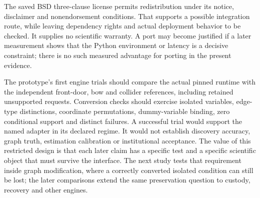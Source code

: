 The saved BSD three-clause license permits redistribution under its
notice, disclaimer and nonendorsement conditions. That supports a
possible integration route, while leaving dependency rights and actual
deployment behavior to be checked. It supplies no scientific warranty. A
port may become justified if a later measurement shows that the Python
environment or latency is a decisive constraint; there is no such
measured advantage for porting in the present evidence.
\citep{exec13_y0_license}

The prototype's first engine trials should compare the actual pinned
runtime with the independent front-door, bow and collider references,
including retained unsupported requests. Conversion checks should
exercise isolated variables, edge-type distinctions, coordinate
permutations, dummy-variable binding, zero conditional support and
distinct failures. A successful trial would support the named adapter in
its declared regime. It would not establish discovery accuracy, graph
truth, estimation calibration or institutional acceptance. The value of
this restricted design is that each later claim has a specific test and
a specific scientific object that must survive the interface. The next study tests that requirement inside graph modification, where a correctly converted isolated condition can still be lost; the later comparisons extend the same preservation question to custody, recovery and other engines.
\label{exec13:python-identification-end}

\label{exec13:interchange-end}
